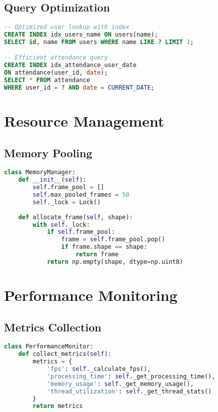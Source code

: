 \subsection{Query Optimization}
\begin{lstlisting}[language=SQL]
-- Optimized user lookup with index
CREATE INDEX idx_users_name ON users(name);
SELECT id, name FROM users WHERE name LIKE ? LIMIT 1;

-- Efficient attendance query
CREATE INDEX idx_attendance_user_date 
ON attendance(user_id, date);
SELECT * FROM attendance 
WHERE user_id = ? AND date = CURRENT_DATE;
\end{lstlisting}

\section{Resource Management}

\subsection{Memory Pooling}
\begin{lstlisting}[language=Python]
class MemoryManager:
    def __init__(self):
        self.frame_pool = []
        self.max_pooled_frames = 50
        self._lock = Lock()
        
    def allocate_frame(self, shape):
        with self._lock:
            if self.frame_pool:
                frame = self.frame_pool.pop()
                if frame.shape == shape:
                    return frame
            return np.empty(shape, dtype=np.uint8)
\end{lstlisting}

\section{Performance Monitoring}

\subsection{Metrics Collection}
\begin{lstlisting}[language=Python]
class PerformanceMonitor:
    def collect_metrics(self):
        metrics = {
            'fps': self._calculate_fps(),
            'processing_time': self._get_processing_time(),
            'memory_usage': self._get_memory_usage(),
            'thread_utilization': self._get_thread_stats()
        }
        return metrics
\end{lstlisting}

